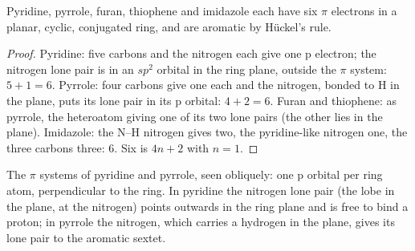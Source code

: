 \begin{proposition}\label{prop:b3:heterocycles:sextet}
Pyridine, pyrrole, furan, thiophene and imidazole each have six $\pi$ electrons in
a planar, cyclic, conjugated ring, and are aromatic by Hückel's rule.
\end{proposition}

\begin{proof}
Pyridine: five carbons and the nitrogen each give one p electron; the nitrogen
lone pair is in an $sp^2$ orbital in the ring plane, outside the $\pi$ system: $5 + 1 = 6$.
Pyrrole: four carbons give one each and the nitrogen, bonded to H in the plane,
puts its lone pair in its p orbital: $4 + 2 = 6$. Furan and thiophene: as pyrrole, the
heteroatom giving one of its two lone pairs (the other lies in the plane). Imidazole:
the N--H nitrogen gives two, the pyridine-like nitrogen one, the three carbons
three: 6. Six is $4n + 2$ with $n = 1$.
\end{proof}

\begin{omfigure}

{\small The $\pi$ systems of pyridine and pyrrole, seen obliquely: one p orbital per
ring atom, perpendicular to the ring. In pyridine the nitrogen lone pair (the lobe in the plane, at the
nitrogen) points outwards in the ring plane and is free to bind a proton; in pyrrole
the nitrogen, which carries a hydrogen in the plane, gives its lone pair to the
aromatic sextet.}
\end{omfigure}


